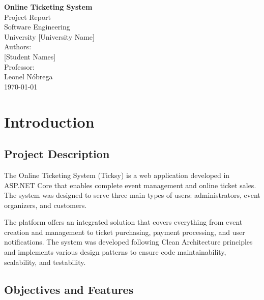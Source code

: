 \documentclass[12pt,a4paper]{article}
\begin{document}
\begin{titlepage}
    \centering
    \vspace*{2cm}
    
    {\Huge\bfseries Online Ticketing System}\\[0.5cm]
    {\Large Project Report}\\[1.5cm]
    
    {\large Software Engineering}\\[0.5cm]
    {\large University [University Name]}\\[2cm]
    
    {\large Authors:}\\
    {\large [Student Names]}\\[1cm]
    
    {\large Professor:}\\
    {\large Leonel Nóbrega}\\[2cm]
    
    {\large \today}
    
    \vfill
\end{titlepage}

\tableofcontents
\newpage

\section{Introduction}

\subsection{Project Description}

The Online Ticketing System (Ticksy) is a web application developed in ASP.NET Core that enables complete event management and online ticket sales. The system was designed to serve three main types of users: administrators, event organizers, and customers.

The platform offers an integrated solution that covers everything from event creation and management to ticket purchasing, payment processing, and user notifications. The system was developed following Clean Architecture principles and implements various design patterns to ensure code maintainability, scalability, and testability.

\subsection{Objectives and Features}
\end{document}
